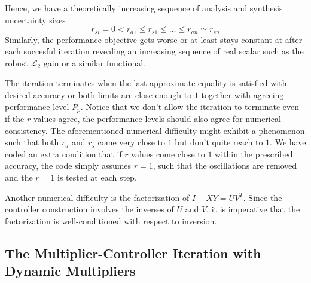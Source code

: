 Hence, we have a theoretically increasing sequence of analysis and synthesis uncertainty sizes 
\[
r_{si} = 0< r_{a1} \leq r_{s1} \leq \ldots \leq r_{an} \simeq r_{sn}
\]
Similarly, the performance objective gets worse or at least stays constant at after each succesful iteration
revealing an increasing sequence of real scalar such as the robust $\mathcal{L}_2$ gain or a similar 
functional. 

The iteration terminates when the last approximate equality is satisfied with desired accuracy or both limits 
are close enough to $1$ together with agreeing performance level $P_p$. Notice that we don't allow the iteration
to terminate even if the $r$ values agree, the performance levels should also agree for numerical consistency. The 
aforementioned numerical difficulty might exhibit a phenomenon such that both $r_{a}$ and $r_{s}$ come very close 
to $1$ but don't quite reach to $1$. We have coded an extra condition that if $r$ values come close to $1$ within 
the prescribed accuracy, the code simply assumes $r=1$, such that the oscillations are removed and the $r=1$ is 
tested at each step. 


Another numerical difficulty is the factorization of $I-XY=UV^T$. Since the controller construction involves the 
inverses of $U$ and $V$, it is imperative that the factorization is well-conditioned with respect to inversion.





\subsection{The Multiplier-Controller Iteration with Dynamic Multipliers}


